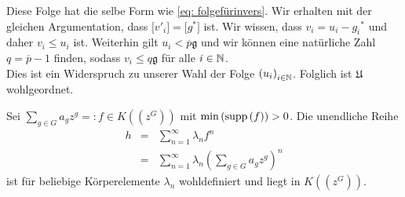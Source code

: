 {Diese Folge hat die selbe Form wie \ref{eq: folgefürinvers}. Wir erhalten mit der gleichen Argumentation, dass $\lbrack {v'}_i\rbrack = \lbrack g^*\rbrack$ ist.
%
%
%
%
%
Wir wissen, dass $v_i = u_i - {g_i}^*$ und daher ${v}_i \le u_i$ ist. Weiterhin gilt $u_i < \overline{p}\mathfrak{g}$ und wir können eine natürliche Zahl $q = \overline{p}-1$ finden, sodass $v_i \le q\mathfrak{g}$ für alle $i \in \mathbb{N}$.\\
Dies ist ein Widerspruch zu unserer Wahl der Folge ${\left(u_i\right)}_{i\in\mathbb{N}}$. Folglich ist $\mathfrak{U}$ wohlgeordnet.
%
%
%
%
%

%
%
%
%

}
\begin{lemma}\label{unendlicheSummeinPotenzreihenring}
%
%
Sei $\sum_{g \in G}^{}a_g z^g =: f \in K\left(\left(z^{G}\right)\right)$ mit $\min\left(\textup{supp}\left(f\right)\right) > 0$. Die unendliche Reihe
%
%
\begin{eqnarray*}
h &=& \sum_{n=1}^{\infty}\lambda_nf^n \\
&=& \sum_{n=1}^{\infty}\lambda_n{\left(\sum_{g \in G}^{}a_g z^g\right)}^n
\end{eqnarray*}
%
%
ist für beliebige Körperelemente $\lambda_n$ wohldefiniert und liegt in $K\left(\left(z^{G}\right)\right)$.
\end{lemma}
% 
% 
%
%
%
% 
%
